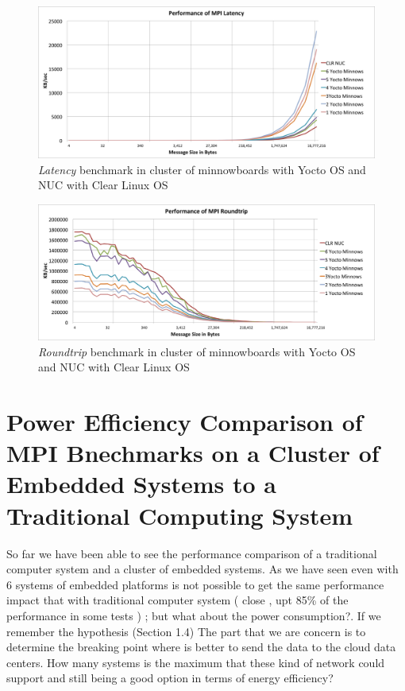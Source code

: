 \begin{figure}[H]
\centering
\includegraphics[width=1.0\textwidth]{images/mpbench_cluster_experiments/mpi_latency.png}
\caption{\textit{Latency} benchmark in cluster of minnowboards with Yocto OS and NUC
with Clear Linux OS}
\label{all_to_all_cluster}
\end{figure}


\begin{figure}[H]
\centering
\includegraphics[width=1.0\textwidth]{images/mpbench_cluster_experiments/mpi_roundtrip.png}
\caption{\textit{Roundtrip} benchmark in cluster of minnowboards with Yocto OS and NUC
with Clear Linux OS}
\label{all_to_all_cluster}
\end{figure}


\section{Power Efficiency Comparison of MPI Bnechmarks on a Cluster of Embedded
Systems to a Traditional Computing System}

So far we have been able to see the performance comparison of a traditional
computer system and a cluster of embedded systems. As we have seen even with 6
systems of embedded platforms is not possible to get the same performance
impact that with traditional computer system ( close , upt 85\% of the
performance in some tests ) ; but what about the power consumption?. If we
remember the hypothesis (Section 1.4) The part that we are concern is to
determine the breaking point where is better to send the data to the cloud data
centers. How many systems is the maximum that these kind of network could
support and still being a good option in terms of energy efficiency?

